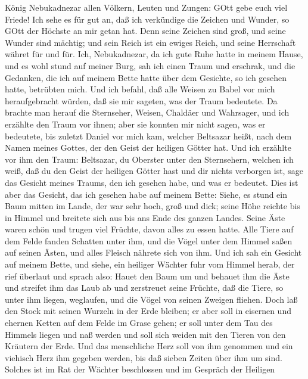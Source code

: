  König Nebukadnezar allen Völkern, Leuten und Zungen: GOtt
gebe euch viel Friede!  Ich sehe es für gut an, daß ich
verkündige die Zeichen und Wunder, so GOtt der Höchste an mir getan hat.
 Denn seine Zeichen sind groß, und seine Wunder sind
mächtig; und sein Reich ist ein ewiges Reich, und seine Herrschaft
währet für und für.  Ich, Nebukadnezar, da ich gute Ruhe
hatte in meinem Hause, und es wohl stund auf meiner Burg, 
sah ich einen Traum und erschrak, und die Gedanken, die ich auf meinem
Bette hatte über dem Gesichte, so ich gesehen hatte, betrübten mich.
 Und ich befahl, daß alle Weisen zu Babel vor mich
heraufgebracht würden, daß sie mir sageten, was der Traum bedeutete.
 Da brachte man herauf die Sternseher, Weisen, Chaldäer und
Wahrsager, und ich erzählte den Traum vor ihnen; aber sie konnten mir
nicht sagen, was er bedeutete,  bis zuletzt Daniel vor mich
kam, welcher Beltsazar heißt, nach dem Namen meines Gottes, der den
Geist der heiligen Götter hat. Und ich erzählte vor ihm den Traum:
 Beltsazar, du Oberster unter den Sternsehern, welchen ich
weiß, daß du den Geist der heiligen Götter hast und dir nichts verborgen
ist, sage das Gesicht meines Traums, den ich gesehen habe, und was er
bedeutet.  Dies ist aber das Gesicht, das ich gesehen habe
auf meinem Bette: Siehe, es stund ein Baum mitten im Lande, der war sehr
hoch,  groß und dick; seine Höhe reichte bis in Himmel und
breitete sich aus bis ans Ende des ganzen Landes.  Seine
Äste waren schön und trugen viel Früchte, davon alles zu essen hatte.
Alle Tiere auf dem Felde fanden Schatten unter ihm, und die Vögel unter
dem Himmel saßen auf seinen Ästen, und alles Fleisch nährete sich von
ihm.  Und ich sah ein Gesicht auf meinem Bette, und siehe,
ein heiliger Wächter fuhr vom Himmel herab,  der rief
überlaut und sprach also: Hauet den Baum um und behauet ihm die Äste und
streifet ihm das Laub ab und zerstreuet seine Früchte, daß die Tiere, so
unter ihm liegen, weglaufen, und die Vögel von seinen Zweigen fliehen.
 Doch laß den Stock mit seinen Wurzeln in der Erde bleiben;
er aber soll in eisernen und ehernen Ketten auf dem Felde im Grase
gehen; er soll unter dem Tau des Himmels liegen und naß werden und soll
sich weiden mit den Tieren von den Kräutern der Erde.  Und
das menschliche Herz soll von ihm genommen und ein viehisch Herz ihm
gegeben werden, bis daß sieben Zeiten über ihm um sind. 
Solches ist im Rat der Wächter beschlossen und im Gespräch der Heiligen
